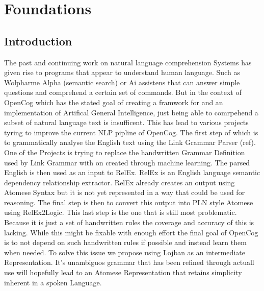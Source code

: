 
\chapter{Foundations} %

\label{Chapter1} %


\newcommand{\keyword}[1]{\textbf{#1}}
\newcommand{\tabhead}[1]{\textbf{#1}}
\newcommand{\code}[1]{\texttt{#1}}
\newcommand{\file}[1]{\texttt{\bfseries#1}}
\newcommand{\option}[1]{\texttt{\itshape#1}}


\section{Introduction}

The past and continuing work on natural language comprehension Systems has given rise to programs that appear to understand human language. Such as Wolpharme Alpha (semantic search) or Ai assistens that can answer simple questions and comprehend a certain set of commands. But in the context of OpenCog which has the stated goal of creating a framwork for and an implementation of Artifical General Intelligence, just being able to comrpehend a subset of natural language text is insufficent. This has lead to various projects tyring to improve the current NLP pipline of OpenCog.
The first step of which is to grammatically analyse the English text using the Link Grammar Parser (ref). One of the Projects is trying to replace the handwritten Grammar Definition used by Link Grammar with on created through machine learning. The parsed English is then used as an input to RelEx. RelEx is an English language semantic dependency relationship extractor. RelEx already creates an output using Atomese Syntax but it is not yet represented in a way that could be used for reasoning. The final step is then to convert this output into PLN style Atomese using RelEx2Logic. This last step is the one that is still most problematic. Because it is just a set of handwritten rules the coverage and accuracy of this is lacking. While this might be fixable with enough effort the final goal of OpenCog is to not depend on such handwritten rules if possible and instead learn them when needed.
To solve this issue we propose using Lojban as an intermediate Representation. It's unambiguos grammar that has been refined through actuall use will hopefully lead to an Atomese Representation that retains simplicity inherent in a spoken Language.

